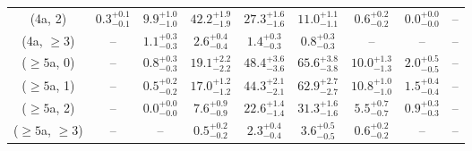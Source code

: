 \begin{table}[h!]
{\begin{tabular}{ccccccccc}
	(4a, 2) & $0.3^{+ 0.1 }_{- 0.1 }$ & $9.9^{+ 1.0 }_{- 1.0 }$ & $42.2^{+ 1.9 }_{- 1.9 }$ & $27.3^{+ 1.6 }_{- 1.6 }$ & $11.0^{+ 1.1 }_{- 1.1 }$ & $0.6^{+ 0.2 }_{- 0.2 }$ & $0.0^{+ 0.0 }_{- 0.0 }$ & -- \\[0.5ex] 
	(4a, $\ge3$) & -- & $1.1^{+ 0.3 }_{- 0.3 }$ & $2.6^{+ 0.4 }_{- 0.4 }$ & $1.4^{+ 0.3 }_{- 0.3 }$ & $0.8^{+ 0.3 }_{- 0.3 }$ & -- & -- & -- \\[0.5ex] 
	($\ge5$a, 0) & -- & $0.8^{+ 0.3 }_{- 0.3 }$ & $19.1^{+ 2.2 }_{- 2.2 }$ & $48.4^{+ 3.6 }_{- 3.6 }$ & $65.6^{+ 3.8 }_{- 3.8 }$ & $10.0^{+ 1.3 }_{- 1.3 }$ & $2.0^{+ 0.5 }_{- 0.5 }$ & -- \\[0.5ex] 
	($\ge5$a, 1) & -- & $0.5^{+ 0.2 }_{- 0.2 }$ & $17.0^{+ 1.2 }_{- 1.2 }$ & $44.3^{+ 2.1 }_{- 2.1 }$ & $62.9^{+ 2.7 }_{- 2.7 }$ & $10.8^{+ 1.0 }_{- 1.0 }$ & $1.5^{+ 0.4 }_{- 0.4 }$ & -- \\[0.5ex] 
	($\ge5$a, 2) & -- & $0.0^{+ 0.0 }_{- 0.0 }$ & $7.6^{+ 0.9 }_{- 0.9 }$ & $22.6^{+ 1.4 }_{- 1.4 }$ & $31.3^{+ 1.6 }_{- 1.6 }$ & $5.5^{+ 0.7 }_{- 0.7 }$ & $0.9^{+ 0.3 }_{- 0.3 }$ & -- \\[0.5ex] 
	($\ge5$a, $\ge3$) & -- & -- & $0.5^{+ 0.2 }_{- 0.2 }$ & $2.3^{+ 0.4 }_{- 0.4 }$ & $3.6^{+ 0.5 }_{- 0.5 }$ & $0.6^{+ 0.2 }_{- 0.2 }$ & -- & -- \\[0.5ex] 
	\hline
	\hline
\end{tabular}}
\end{table}
